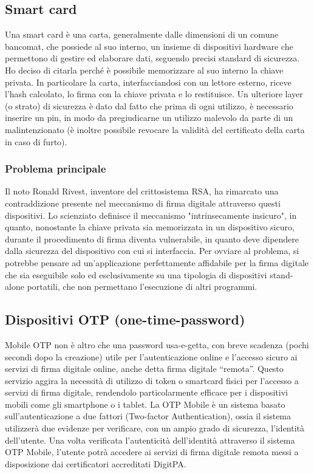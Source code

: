 \subsection{Smart card}

Una smart card è una carta, generalmente dalle dimensioni di un comune bancomat, che possiede al suo interno, un insieme di dispositivi hardware che permettono di gestire ed elaborare dati, seguendo precisi standard di sicurezza. Ho deciso di citarla perché è possibile memorizzare al suo interno la chiave privata. In particolare la carta, interfacciandosi con un lettore esterno, riceve l'hash calcolato, lo firma con la chiave privata e lo restituisce. Un ulteriore layer (o strato) di sicurezza è dato dal fatto che prima di ogni utilizzo, è necessario inserire un pin, in modo da pregiudicarne un utilizzo malevolo da parte di un malintenzionato (è inoltre possibile revocare la validità del certificato della carta in caso di furto).

\subsubsection{Problema principale}

Il noto Ronald Rivest, inventore del crittosistema RSA, ha rimarcato una contraddizione presente nel meccanismo di firma digitale attraverso questi dispositivi. Lo scienziato definisce il meccanismo "intrinsecamente insicuro", in quanto, nonostante la chiave privata sia memorizzata in un dispositivo sicuro, durante il procedimento di firma diventa vulnerabile, in quanto deve dipendere dalla sicurezza del dispositivo con cui si interfaccia. Per ovviare al problema, si potrebbe pensare ad un'applicazione perfettamente affidabile per la firma digitale che sia eseguibile solo ed esclusivamente su una tipologia di dispositivi stand-alone portatili, che non permettano l'esecuzione di altri programmi.

\subsection{Dispositivi OTP (one-time-password)}

Mobile OTP non è altro che una password usa-e-getta, con breve scadenza (pochi secondi dopo la creazione) utile per l’autenticazione online e l’accesso sicuro ai servizi di firma digitale online, anche detta firma digitale “remota”.
Questo servizio aggira la necessità di utilizzo di token o smartcard fisici per l’accesso a servizi di firma digitale, rendendolo particolarmente efficace per i dispositivi mobili come gli smartphone o i tablet.
La OTP Mobile è un sistema basato sull’autenticazione a due fattori (Two-factor Authentication), ossia il sistema utilizzerà due evidenze per verificare, con un ampio grado di sicurezza, l’identità dell’utente.  Una volta verificata l’autenticità dell’identità attraverso il sistema OTP Mobile, l’utente potrà accedere ai servizi di firma digitale remota messi a disposizione dai certificatori accreditati DigitPA.
